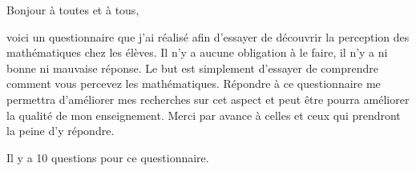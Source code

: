 \documentclass{article}
\begin{document}
Bonjour à toutes et à tous,

 voici un questionnaire que j'ai réalisé afin d'essayer de découvrir
 la perception des mathématiques chez les élèves. 
Il n'y a aucune obligation à le faire, il n'y a ni bonne ni mauvaise réponse.
Le but est simplement d'essayer de comprendre comment vous percevez les mathématiques.
Répondre à ce questionnaire me permettra d'améliorer mes recherches
 sur cet aspect et peut être pourra améliorer la qualité de mon enseignement. 
Merci par avance à celles et ceux qui prendront la peine d'y répondre.

Il y a 10 questions pour ce questionnaire. \vspace{.25cm}

\newenvironment{Phrase}{%
\begin{list}{Phrase \arabic{rep1} :}
{\usecounter{rep1}%
\setlength{\labelwidth}{1.8cm}%
\setlength{\labelsep}{0.1cm}%
\setlength{\leftmargin}{2cm}%
\setlength{\itemindent}{0cm}}}
{\end{list}}

\newenvironment{Mot}{%
\begin{list}{Mot \arabic{rep2} :}
{\usecounter{rep2}%
\setlength{\labelwidth}{1.8cm}%
\setlength{\labelsep}{0.1cm}%
\setlength{\leftmargin}{2cm}%
\setlength{\itemindent}{0cm}}}
{\end{list}}

\newenvironment{Mathématicien}{%
\begin{list}{Mathématicien \arabic{rep3} :}
{\usecounter{rep3}%
\setlength{\labelwidth}{1.8cm}%
\setlength{\labelsep}{0.1cm}%
\setlength{\leftmargin}{2cm}%
\setlength{\itemindent}{0cm}}}
{\end{list}}

\newenvironment{Argument}{%
\begin{list}{Argument \arabic{rep5} :}
{\usecounter{rep5}%
\setlength{\labelwidth}{1.8cm}%
\setlength{\labelsep}{0.1cm}%
\setlength{\leftmargin}{2cm}%
\setlength{\itemindent}{0cm}}}
{\end{list}}

\newenvironment{Qualité}{%
\begin{list}{Qualité \arabic{rep6} :}
{\usecounter{rep6}%
\setlength{\labelwidth}{1.8cm}%
\setlength{\labelsep}{0.1cm}%
\setlength{\leftmargin}{2cm}%
\setlength{\itemindent}{0cm}}}
{\end{list}}

\newenvironment{Domaine}{%
\begin{list}{Domaine \arabic{rep8} :}
{\usecounter{rep8}%
\setlength{\labelwidth}{1.8cm}%
\setlength{\labelsep}{0.1cm}%
\setlength{\leftmargin}{2cm}%
\setlength{\itemindent}{0cm}}}
{\end{list}}
\end{document}
